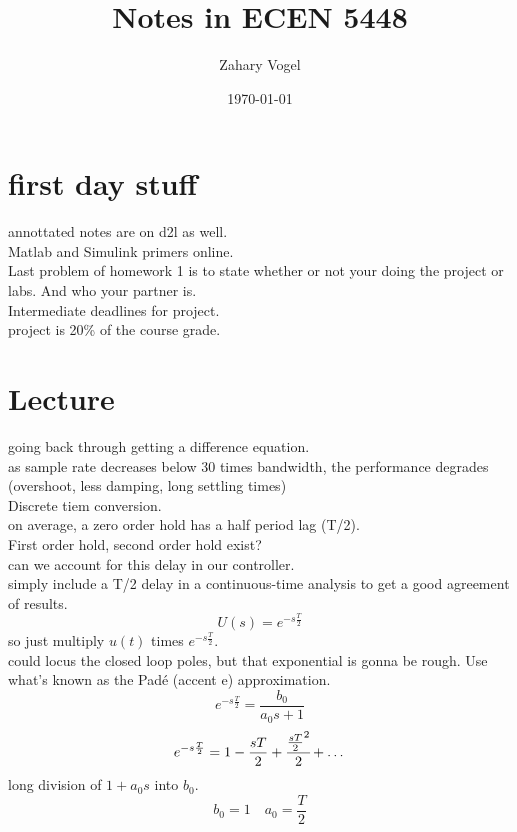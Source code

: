 \documentclass{article}
\author{Zahary Vogel}
\date{\today}
\title{Notes in ECEN 5448}
\begin{document}
\maketitle


\section*{first day stuff}
annottated notes are on d2l as well.\\

Matlab and Simulink primers online.\\

Last problem of homework 1 is to state whether or not your doing the project or labs. And who your partner is.\\

Intermediate deadlines for project.\\

project is 20\% of the course grade.

\section*{Lecture}
going back through getting a difference equation.\\

as sample rate decreases below 30 times bandwidth, the performance degrades (overshoot, less damping, long settling times)\\

Discrete tiem conversion.\\

on average, a zero order hold has a half period lag (T/2).\\
First order hold, second order hold exist?\\
can we account for this delay in our controller.\\
simply include a T/2 delay in a continuous-time analysis to get a good agreement of results.\\
\[U(s)=e^{-s\frac{T}{2}}\]
so just multiply $u(t)$ times $e^{-s\frac{T}{2}}$.\\
could locus the closed loop poles, but that exponential is gonna be rough. Use what's known as the Pad\'{e} (accent e) approximation.\\
\[e^{-s\frac{T}{2}}=\frac{b_0}{a_0s+1}\]
\[e^{-s\frac{T}{2}}=1-\frac{sT}{2}+\cfrac{\frac{sT}{2}^2}{2}+\dots\]
long division of $1+a_0s$ into $b_0$.\\
\[b_0=1\quad a_0=\frac{T}{2}\]
\end{document}
